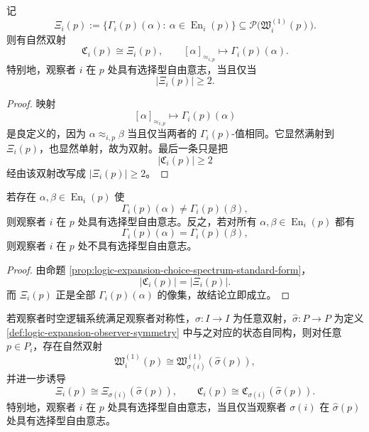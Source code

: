 \begin{proposition}[选择谱的标准形]\label{prop:logic-expansion-choice-spectrum-standard-form}
记
\[
\Xi_i(p):=
\{\Gamma_i(p)(\alpha):\ \alpha\in \operatorname{En}_i(p)\}
\subseteq \mathcal P\bigl(\mathfrak W_i^{(1)}(p)\bigr).
\]
则有自然双射
\[
\mathfrak C_i(p)\cong \Xi_i(p),
\qquad
[\alpha]_{\approx_{i,p}}\longmapsto \Gamma_i(p)(\alpha).
\]
特别地，观察者 \(i\) 在 \(p\) 处具有选择型自由意志，当且仅当
\[
|\Xi_i(p)|\ge 2.
\]
\end{proposition}

\begin{proof}
映射
\[
[\alpha]_{\approx_{i,p}}\longmapsto \Gamma_i(p)(\alpha)
\]
是良定义的，因为 \(\alpha\approx_{i,p}\beta\) 当且仅当两者的 \(\Gamma_i(p)\)-值相同。它显然满射到 \(\Xi_i(p)\)，也显然单射，故为双射。最后一条只是把
\[
|\mathfrak C_i(p)|\ge 2
\]
经由该双射改写成 \(|\Xi_i(p)|\ge 2\)。
\end{proof}

\begin{corollary}[一步判据]\label{cor:logic-expansion-choice-spectrum-one-step-criterion}
若存在 \(\alpha,\beta\in \operatorname{En}_i(p)\) 使
\[
\Gamma_i(p)(\alpha)\neq \Gamma_i(p)(\beta),
\]
则观察者 \(i\) 在 \(p\) 处具有选择型自由意志。反之，若对所有 \(\alpha,\beta\in \operatorname{En}_i(p)\) 都有
\[
\Gamma_i(p)(\alpha)=\Gamma_i(p)(\beta),
\]
则观察者 \(i\) 在 \(p\) 处不具有选择型自由意志。
\end{corollary}

\begin{proof}
由命题 \ref{prop:logic-expansion-choice-spectrum-standard-form}，
\[
|\mathfrak C_i(p)|=|\Xi_i(p)|.
\]
而 \(\Xi_i(p)\) 正是全部 \(\Gamma_i(p)(\alpha)\) 的像集，故结论立即成立。
\end{proof}

\begin{theorem}[观察者对称性下的不变性]\label{thm:logic-expansion-choice-spectrum-symmetry-invariance}
若观察者时空逻辑系统满足观察者对称性，\(\sigma:I\to I\) 为任意双射，\(\widehat{\sigma}:P\to P\) 为定义 \ref{def:logic-expansion-observer-symmetry} 中与之对应的状态自同构，则对任意 \(p\in P_i\)，存在自然双射
\[
\mathfrak W_i^{(1)}(p)\cong \mathfrak W_{\sigma(i)}^{(1)}(\widehat{\sigma}(p)),
\]
并进一步诱导
\[
\Xi_i(p)\cong \Xi_{\sigma(i)}(\widehat{\sigma}(p)),
\qquad
\mathfrak C_i(p)\cong \mathfrak C_{\sigma(i)}(\widehat{\sigma}(p)).
\]
特别地，观察者 \(i\) 在 \(p\) 处具有选择型自由意志，当且仅当观察者 \(\sigma(i)\) 在 \(\widehat{\sigma}(p)\) 处具有选择型自由意志。
\end{theorem}

